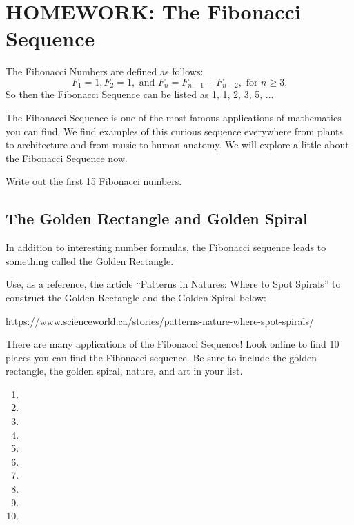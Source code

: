 
\section{HOMEWORK: The Fibonacci Sequence}

The Fibonacci Numbers are defined as follows:
\begin{equation}
    F_1=1, F_2 = 1, \text{ and } F_n=F_{n-1}+F_{n-2}, \text{ for } n \geq 3.
\end{equation}
\noindent So then the Fibonacci Sequence can be listed as 1, 1, 2, 3, 5, $\ldots$ 

\noindent The Fibonacci Sequence is one of the most famous applications of mathematics you can find. We find examples of this curious sequence everywhere from plants to architecture and from music to human anatomy. We will explore a little about the Fibonacci Sequence now.

\begin{exercise}
Write out the first 15 Fibonacci numbers.
\end{exercise}	

\vspace{3in}



\subsection{The Golden Rectangle and Golden Spiral}

In addition to interesting number formulas, the Fibonacci sequence leads to something called the Golden Rectangle. 

\begin{exercise}
Use, as a reference, the article “Patterns in Natures: Where to Spot Spirals” \cite{patterns_in_nature} to construct the Golden Rectangle and the Golden Spiral below:
\end{exercise} 
\footnotesize{https://www.scienceworld.ca/stories/patterns-nature-where-spot-spirals/}

\vspace{3in}

\begin{exercise}
There are many applications of the Fibonacci Sequence! Look online to find 10 places you can find the Fibonacci sequence. Be sure to include the golden rectangle, the golden spiral, nature, and art in your list.
\end{exercise}

\begin{enumerate}
    \item 
    \item
    \item
    \item
    \item
    \item
    \item
    \item
    \item
    \item
\end{enumerate}
